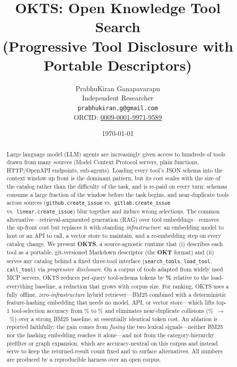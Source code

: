 \documentclass[11pt]{article}
\title{\textbf{OKTS: Open Knowledge Tool Search\\
(Progressive Tool Disclosure with Portable Descriptors)}}
\author{PrabhuKiran Ganapavarapu\\
\small Independent Researcher \\
\small \texttt{prabhukiran.g@gmail.com} \\
\small ORCID: \href{https://orcid.org/0009-0001-9971-9589}{0009-0001-9971-9589}}
\date{\today}
\begin{document}
\maketitle

\begin{abstract}
Large language model (LLM) agents are increasingly given access to hundreds of
tools drawn from many sources (Model Context Protocol servers, plain functions,
HTTP/OpenAPI endpoints, sub-agents). Loading every tool's JSON schema into the
context window up front is the dominant pattern, but its cost scales with the
size of the catalog rather than the difficulty of the task, and is re-paid on
every turn: schemas consume a large fraction of the window before the task
begins, and near-duplicate tools across sources (\texttt{github.create\_issue} vs.\
\texttt{gitlab.create\_issue} vs.\ \texttt{linear.create\_issue}) blur together
and induce wrong selections. The common alternative---retrieval-augmented
generation (RAG) over tool embeddings---removes the up-front cost but replaces it
with standing \emph{infrastructure}: an embedding model to host or an API to
call, a vector store to maintain, and a re-embedding step on every catalog
change. We present \textbf{OKTS}, a source-agnostic runtime that (i) describes
each tool as a portable, git-versioned Markdown descriptor (the \textbf{OKT}
format) and (ii) serves any catalog behind a fixed three-tool interface
(\texttt{search\_tools}, \texttt{load\_tool}, \texttt{call\_tool}) via
\emph{progressive disclosure}. On a corpus of \numTools{} tools adapted from
\numServers{} widely used MCP servers, OKTS reduces per-query tool-schema tokens
by \textbf{\reductionFull\%} relative to the load-everything baseline, a
reduction that grows with corpus size. For ranking, OKTS uses a fully offline,
\emph{zero-infrastructure} hybrid retriever---BM25 combined with a deterministic
feature-hashing embedding that needs no model, API, or vector store---which lifts
top-1 tool-selection accuracy from \flatAccOne\% to \graphAccOne\% and eliminates
near-duplicate collisions (\flatColl\%~$\rightarrow$~\graphColl\%) over a strong
BM25 baseline, at essentially identical token cost. An ablation is reported
faithfully: the gain comes from \emph{fusing} the two lexical signals---neither
BM25 nor the hashing embedding reaches it alone---and not from the
category-hierarchy prefilter or graph expansion, which are accuracy-neutral on
this corpus and instead serve to keep the returned-result count fixed and to
surface alternatives. All numbers are produced by a reproducible harness over an
open corpus.
\end{abstract}
\end{document}
